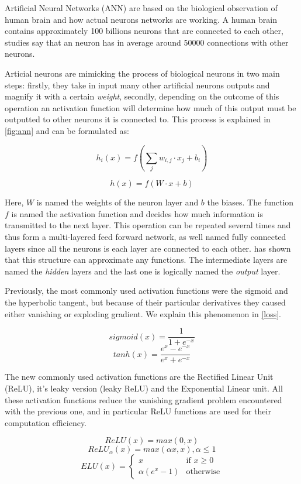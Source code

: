 \documentclass[master, tikz, final,11pt, dvipdfmx]{iscs-thesis}
\begin{document}
Artificial Neural Networks (ANN) are based on the biological observation of human brain and how actual neurons networks are working. A human brain contains approximately 100 billions neurons that are connected to each other, studies say that an neuron has in average around 50000 connections with other neurons.

Articial neurons are mimicking the process of biological neurons in two main steps: firstly, they take in input many other artificial neurons outputs and magnify it with a certain \textit{weight}, secondly, depending on the outcome of this operation an activation function will determine how much of this output must be outputted to other neurons it is connected to. This process is explained in \autoref{fig:ann} and can be formulated as:


\[
	h_{i}(x) = f(\sum_{j}{w_{i,j}\cdot x_j} + b_i)
\]

\[
	h(x) = f(W \cdot x + b)
\]

Here, $W$ is named the weights of the neuron layer and $b$ the biases. The function $f$ is named the activation function and decides how much information is transmitted to the next layer. This operation can be repeated several times and thus form a multi-layered feed forward network, as well named fully connected layers since all the neurons is each layer are connected to each other. \cite{FFN} has shown that this structure can approximate any functions. The intermediate layers are named the \textit{hidden} layers and the last one is logically named the \textit{output} layer.

Previously, the most commonly used activation functions were the sigmoid and the hyperbolic tangent, but because of their particular derivatives they caused either vanishing or exploding gradient. We explain this phenomenon in \autoref{loss}. 

\[sigmoid(x)  = \frac{1}{1+e^{-x}}\]
\[tanh(x)  = \frac{e^x - e^{-x}}{e^x + e^{-x}}\]

The new commonly used activation functions are the Rectified Linear Unit (ReLU), it's leaky version (leaky ReLU) and the Exponential Linear unit. All these activation functions reduce the vanishing gradient problem encountered with the previous one, and in particular ReLU functions are used for their computation efficiency.

\[ReLU(x)  = max(0,x)\]
\[ReLU_{\alpha}(x)  = max(\alpha x, x), \alpha 	\leq 1 \]
\[ELU(x)  = \left\{
    \begin{array}{ll}
        x & \mbox{if } x \geq 0 \\
        \alpha (e^x-1) & \mbox{otherwise}
    \end{array}
\right. \]
\end{document}

